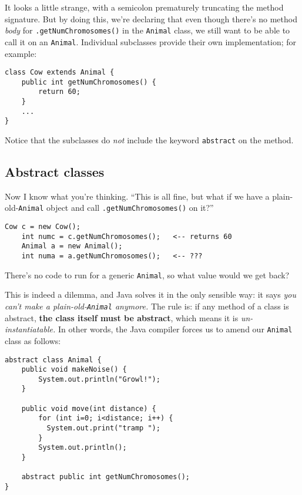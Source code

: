It looks a little strange, with a semicolon prematurely truncating the method
signature. But by doing this, we're declaring that even though there's no
method \textit{body} for \texttt{.getNumChromosomes()} in the \texttt{Animal}
class, we still want to be able to call it on an \texttt{Animal}. Individual 
subclasses provide their own implementation; for example:

\begin{Verbatim}[fontsize=\small,samepage=true,frame=single]
class Cow extends Animal {
    public int getNumChromosomes() {
        return 60;
    }
    ...
}
\end{Verbatim}

Notice that the subclasses do \textit{not} include the keyword \texttt{abstract}
on the method.

\vspace{.7in}
\subsection{Abstract classes}

Now I know what you're thinking. ``This is all fine, but what if we have a
plain-old-\texttt{Animal} object and call \texttt{.getNumChromosomes()} on
it?'' 

\begin{Verbatim}[fontsize=\small,samepage=true,frame=single]
    Cow c = new Cow();
    int numc = c.getNumChromosomes();   <-- returns 60
    Animal a = new Animal();
    int numa = a.getNumChromosomes();   <-- ???
\end{Verbatim}

There's no code to run for a generic \texttt{Animal}, so what value would we
get back?

This is indeed a dilemma, and Java solves it in the only sensible way: it says
\textit{you can't make a plain-old-\texttt{Animal} anymore.} The rule is: if
any method of a class is abstract, \textbf{the class itself must be abstract},
which means it is \textit{un-instantiatable.} In other words, the Java
compiler forces us to amend our \texttt{Animal} class as follows:

\begin{Verbatim}[fontsize=\small,samepage=true,frame=single]
abstract class Animal {                         
    public void makeNoise() {            
        System.out.println("Growl!");      
    }                                    

    public void move(int distance) {     
        for (int i=0; i<distance; i++) {   
          System.out.print("tramp ");      
        }                                  
        System.out.println();              
    }

    abstract public int getNumChromosomes();
}                                      
\end{Verbatim}

